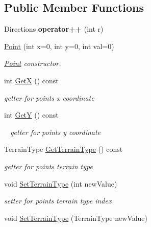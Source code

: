 \subsection*{Public Member Functions}
\begin{DoxyCompactItemize}
\item 
\mbox{\label{class_point_aa531683e6c851abf7e6fffdcb9fd2ad9}} 
Directions {\bfseries operator++} (int r)
\item 
\mbox{\hyperlink{class_point_aba5766336ccc353ae31b6a0edd03bc30}{Point}} (int x=0, int y=0, int val=0)
\begin{DoxyCompactList}\small\item\em \mbox{\hyperlink{class_point}{Point}} constructor. \end{DoxyCompactList}\item 
int \mbox{\hyperlink{class_point_a1df5f9a8e3606705ebeec25384f58f8b}{GetX}} () const
\begin{DoxyCompactList}\small\item\em getter for point\textquotesingle{}s x coordinate \end{DoxyCompactList}\item 
\mbox{\label{class_point_a28eaaae3447a8d5485a690196eb6d8da}} 
int \mbox{\hyperlink{class_point_a28eaaae3447a8d5485a690196eb6d8da}{GetY}} () const
\begin{DoxyCompactList}\small\item\em ~\newline
getter for point\textquotesingle{}s y coordinate \end{DoxyCompactList}\item 
Terrain\+Type \mbox{\hyperlink{class_point_af1d2f948542642bdeb25eebec21ef06f}{Get\+Terrain\+Type}} () const
\begin{DoxyCompactList}\small\item\em getter for point\textquotesingle{}s terrain type \end{DoxyCompactList}\item 
void \mbox{\hyperlink{class_point_aac7fb5fc8d1d5950f8ad7c8577ed2d65}{Set\+Terrain\+Type}} (int new\+Value)
\begin{DoxyCompactList}\small\item\em setter for point\textquotesingle{}s terrain type index \end{DoxyCompactList}\item 
void \mbox{\hyperlink{class_point_a226ab770c8f00be177167818821df9dc}{Set\+Terrain\+Type}} (Terrain\+Type new\+Value)

\end{DoxyCompactItemize}
